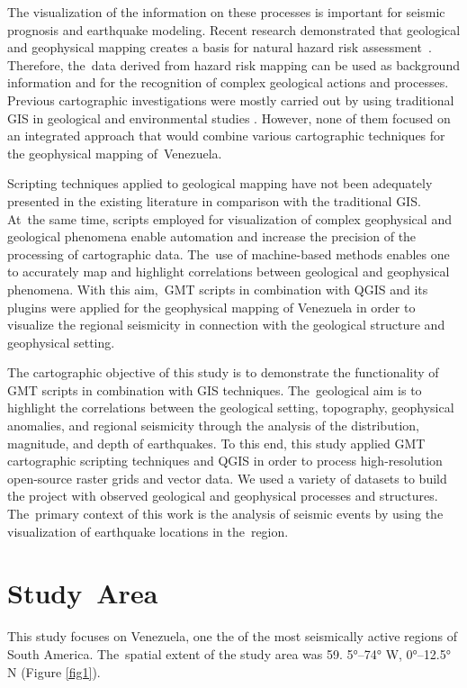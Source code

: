 \documentclass[sustainability,article,accept,pdftex,moreauthors]{Definitions/mdpi}
\begin{document}
{The }visualization of the information on these processes is {important }for seismic prognosis and earthquake modeling. Recent research demonstrated that geological and geophysical mapping creates a basis for natural hazard risk assessment~\cite{su10020304,su131810232,Lemenkova202212,app11219919,ijgi10030118}. Therefore, the~data derived from hazard risk mapping can be used as background information and for the recognition of complex geological actions and processes{. }Previous cartographic investigations were mostly  carried out by using traditional GIS in geological and environmental studies \citep{Gonzalez,Hackley,Schmitz2021,Sun}. However, none of them focused on an integrated approach {that would combine }various cartographic techniques for the geophysical mapping of~Venezuela. 

{Scripting techniques applied to }geological mapping have not been adequately presented in the existing literature{ in comparison with the traditional GIS}. At~the same time, scripts{ }employed for visualization of  complex geophysical and geological phenomena enable automation{ }and increase the precision of {the processing of }cartographic data. The~use of machine-based methods enables one to accurately map and highlight{ }correlations between geological and geophysical phenomena{. }With this aim,~GMT {scripts }in combination with QGIS and its plugins{ }were applied for the geophysical mapping of Venezuela {in order to visualize the }regional seismicity {in connection }with the geological structure {and geophysical setting}. 

{The }cartographic objective {of this study }is to demonstrate the {functionality }of GMT scripts in  combination with GIS techniques. The~geological aim is to highlight the correlations between the geological setting, topography,  geophysical anomalies, and regional seismicity through the analysis of the distribution, magnitude, and depth of earthquakes. {To this end, this }study applied  GMT  cartographic scripting techniques and QGIS {in order to process }high-resolution open-source raster grids and vector data. We used a variety of datasets to build the project with observed geological and geophysical processes and structures{. The~primary }context {of this work is }the analysis of seismic events {by using }the visualization of earthquake locations{ }in the~region. 

\section{Study~Area}
This study focuses on Venezuela{, }one the of the most seismically active regions{ }of {South America. The~spatial extent of the study area was} 59.%
5°--74° W, 0°--12.5° N{ }(Figure \ref{fig1}). 
\end{document}
